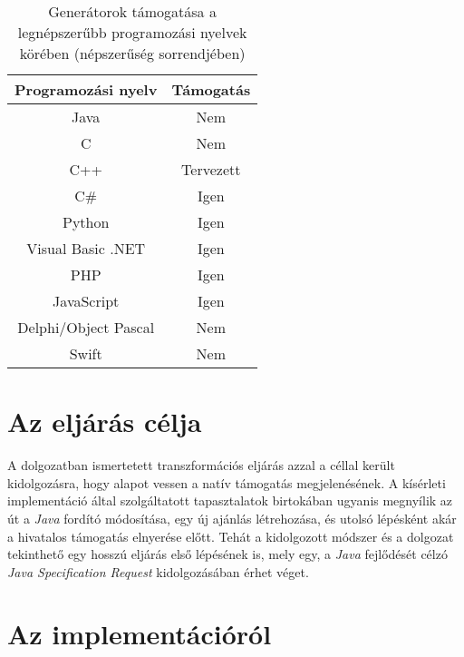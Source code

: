   \begin{table}
  \captionsetup{justification=centering}
  \centering
    \begin{tabular}{|| c | c ||}
    \hline
    Programozási nyelv & Támogatás \\
    \hline \hline
    Java                  & Nem \\
    C                     & Nem \\
    C++                   & Tervezett \\
    C\#                   & Igen \\
    Python                & Igen \\
    Visual Basic .NET     & Igen \\
    PHP                   & Igen \\
    JavaScript            & Igen \\
    Delphi/Object Pascal  & Nem \\
    Swift                 & Nem \\
    \hline
    \end{tabular}
  \caption{Generátorok támogatása a legnépszerűbb programozási nyelvek körében (népszerűség sorrendjében)}  
  \label{table:1}
  \end{table}
\fi
\section{Az eljárás célja}

A dolgozatban ismertetett transzformációs eljárás azzal a céllal került kidolgozásra, hogy alapot vessen a natív támogatás megjelenésének. A kísérleti implementáció által szolgáltatott tapasztalatok birtokában ugyanis megnyílik az út a \textit{Java} fordító módosítása, egy új ajánlás létrehozása, és utolsó lépésként akár a hivatalos támogatás elnyerése előtt. 
Tehát a kidolgozott módszer és a dolgozat tekinthető egy hosszú eljárás első lépésének is, mely egy, a \textit{Java} fejlődését célzó \textit{Java Specification Request} kidolgozásában érhet véget. 

\section{Az implementációról}

